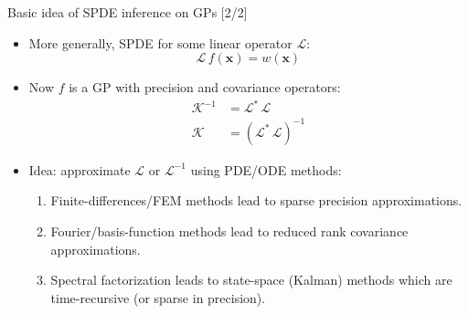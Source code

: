 \documentclass[first=dgreen,second=purple,presentation]{elecslides}
\begin{document}
\begin{frame}{Basic idea of SPDE inference on GPs [2/2]}
\begin{itemize}[<+->]
\item More generally, \alert{SPDE} for some linear operator $\mathcal{L}$:
\begin{equation}
  \mathcal{L} \, f(\mathbf{x}) = w(\mathbf{x})
\nonumber
\end{equation}

\item Now $f$ is a GP with \alert{precision and covariance operators}:
\begin{equation}
\begin{split}
  \mathcal{K}^{-1} &= \mathcal{L}^* \, \mathcal{L} \\
  \mathcal{K} &= (\mathcal{L}^* \, \mathcal{L})^{-1}
\end{split}
\nonumber
\end{equation}

\item \alert{Idea:} approximate $\mathcal{L}$ or $\mathcal{L}^{-1}$ using PDE/ODE methods:
\begin{enumerate}[<+->]
\item \alert{Finite-differences/FEM} methods lead to \alert{sparse precision approximations}.
\item \alert{Fourier/basis-function} methods lead to \alert{reduced rank covariance approximations}.
\item \alert{Spectral factorization} leads to state-space (Kalman) methods which are \alert{time-recursive} (or sparse in precision).
\end{enumerate}

\end{itemize}

\end{frame}
\end{document}
